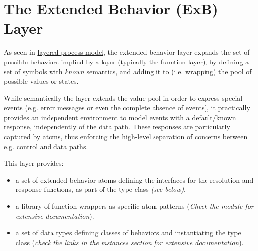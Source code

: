 \section{The Extended Behavior (ExB) Layer}
As seen in \href{#layered-model}{layered process model}, the extended
 behavior layer expands the set of possible behaviors implied by a
 layer (typically the function layer), by defining a set of
 symbols with \emph{known} semantics, and adding it to (i.e. wrapping)
 the pool of possible values or states.\par
While semantically the  layer extends the value pool in
 order to express special events (e.g. error messages or even the
 complete absence of events), it practically provides an
 independent environment to model events with a default/known
 response, independently of the data path. These responses are
 particularly captured by atoms, thus enforcing the high-level
 separation of concerns between e.g. control and data paths.\par
This layer provides:\par
\begin{itemize}
\item
a set of extended behavior atoms defining the interfaces for
 the resolution and response functions, as part of the  type
 class \emph{(see below)}.\par

\item
a library of function wrappers as specific atom patterns
 (\emph{Check the  module for extensive}
 \emph{documentation}).\par

\item
a set of data types defining classes of behaviors and
 instantiating the  type class (\emph{check the links in the}
 \emph{\href{#section.i:ExB}{instances} section for extensive documentation}).\par

\end{itemize}

